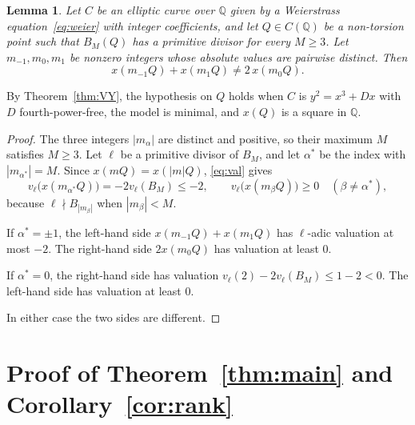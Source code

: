 \documentclass[11pt]{amsart}
\newtheorem{lemma}[theorem]{Lemma}
\theoremstyle{definition}
\theoremstyle{remark}
\newcommand{\Q}{\mathbb{Q}}
\begin{document}
\begin{lemma}\label{lem:noAP}
Let $C$ be an elliptic curve over $\Q$ given by a Weierstrass equation~\eqref{eq:weier} with integer
coefficients, and let $Q\in C(\Q)$ be a non-torsion point such that $B_M(Q)$ has a primitive divisor for
every $M\ge3$. Let $m_{-1},m_0,m_1$ be nonzero integers whose absolute values are pairwise distinct. Then
\[
x(m_{-1}Q)+x(m_1Q)\ne2\,x(m_0Q).
\]
\end{lemma}

By Theorem~\ref{thm:VY}, the hypothesis on $Q$ holds when $C$ is $y^2=x^3+Dx$ with $D$ fourth-power-free,
the model is minimal, and $x(Q)$ is a square in $\Q$.

\begin{proof}
The three integers $|m_\alpha|$ are distinct and positive, so their maximum $M$ satisfies $M\ge3$. Let
$\ell$ be a primitive divisor of $B_M$, and let $\alpha^*$ be the index with $|m_{\alpha^*}|=M$. Since
$x(mQ)=x(|m|Q)$, \eqref{eq:val} gives
\[
v_\ell\bigl(x(m_{\alpha^*}Q)\bigr)=-2v_\ell(B_M)\le-2,
\qquad
v_\ell\bigl(x(m_\beta Q)\bigr)\ge0\quad(\beta\ne\alpha^*),
\]
because $\ell\nmid B_{|m_\beta|}$ when $|m_\beta|<M$.

If $\alpha^*=\pm1$, the left-hand side $x(m_{-1}Q)+x(m_1Q)$ has $\ell$-adic valuation at most $-2$. The
right-hand side $2x(m_0Q)$ has valuation at least $0$.

If $\alpha^*=0$, the right-hand side has valuation $v_\ell(2)-2v_\ell(B_M)\le1-2<0$. The left-hand side
has valuation at least $0$.

In either case the two sides are different.
\end{proof}

\section{Proof of Theorem~\ref{thm:main} and Corollary~\ref{cor:rank}}
\end{document}
